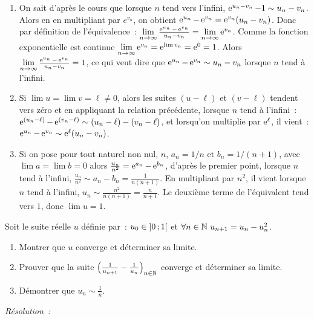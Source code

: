 \begin{enumerate}
    \item On sait d'après le cours que lorsque \(n\) tend vers l'infini, \(\operatorname{e}^{u_n-v_n}-1 \sim u_n-v_n\). Alors en en multipliant par \(e^{v_n}\), on obtient \(\operatorname{e}^{u_n}-\operatorname{e}^{v_n} = \operatorname{e}^{v_n} (u_n - v_n)\). Donc par définition de l'équivalence~: \(\lim\limits_{n\to \infty} \frac{\operatorname{e}^{u_n}-\operatorname{e}^{v_n} }{u_n-v_n} = \lim\limits_{n\to \infty} \operatorname{e}^{v_n}\). Comme la fonction exponentielle est continue \(\lim\limits_{n\to \infty} \operatorname{e}^{v_n} = \operatorname{e}^{\lim v_n} = \operatorname{e}^{0} = 1\). Alors \(\lim\limits_{n\to \infty} \frac{\operatorname{e}^{u_n}-\operatorname{e}^{v_n} }{u_n-v_n} = 1\), ce qui veut dire que \(\operatorname{e}^{u_n}-\operatorname{e}^{v_n} \sim u_n - v_n\) lorsque \(n\) tend à l'infini.
    \item Si \(\lim u = \lim v = \ell \neq 0\), alors les suites \((u-\ell)\) et \((v-\ell)\) tendent vers zéro et en appliquant la relation précédente, lorsque \(n\) tend à l'infini~: \(\operatorname{e}^{(u_n-\ell)} - \operatorname{e}^{(v_n-\ell)} \sim (u_n-\ell) - (v_n-\ell)\), et lorsqu'on multiplie par \(\operatorname{e}^{\ell}\), il vient~: \(\operatorname{e}^{u_n}-\operatorname{e}^{v_n} \sim \operatorname{e}^{\ell}(u_n - v_n)\).
    \item Si on pose pour tout naturel non nul, \(n\), \(a_n = 1/n\) et \(b_n = 1/(n+1)\), avec \(\lim a = \lim b = 0\) alors \(\frac{u_n}{n^2} = \operatorname{e}^{a_n} -\operatorname{e}^{b_n}\), d'après le premier point, lorsque \(n\) tend à l'infini, \(\frac{u_n}{n^2} \sim a_n - b_n = \frac{1}{n(n+1)}\). En multipliant par \(n^2\), il vient lorsque \(n\) tend à l'infini, \(u_n \sim \frac{n^2}{n(n+1)} = \frac{n}{n+1}\). Le deuxième terme de l'équivalent tend vers \(1\), donc \(\lim u = 1\).
\end{enumerate}
\begin{exercice}
    Soit le suite réelle \(u\) définie par~: \(u_0 \in \left] 0 \, ;  1 \right[\) et \(\forall n \in \mathbb{N} \ u_{n+1} = u_n - u_n^2\).
    \begin{enumerate}
        \item Montrer que \(u\) converge et déterminer sa limite.
        \item Prouver que la suite \(\left(\frac{1}{u_{n+1}} - \frac{1}{u_n}\right)_{n \in \mathbb{N}}\) converge et déterminer sa limite.
        \item Démontrer que \(u_n \sim \frac{1}{n}\).
    \end{enumerate}
\end{exercice}
\emph{Résolution~:}
